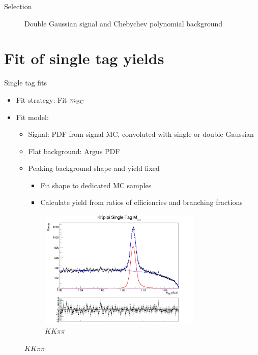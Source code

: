 \documentclass{beamer}
\begin{document}
\begin{frame}{Selection}
\begin{figure}
\begin{subfigure}{0.5\textwidth}
    \end{subfigure}
    \caption{Double Gaussian signal and Chebychev polynomial background}
  \end{figure}
\end{frame}

\section{Fit of single tag yields}
\begin{frame}{Single tag fits}
  \begin{itemize}
    \item{Fit strategy: Fit $m_{\rm BC}$}
    \item{Fit model:}
    \begin{itemize}
      \item{Signal: PDF from signal MC, convoluted with single or double Gaussian}
      \item{Flat background: Argus PDF}
      \item{Peaking background shape and yield fixed}
      \begin{itemize}
        \item{Fit shape to dedicated MC samples}
        \item{Calculate yield from ratios of efficiencies and branching fractions}
      \end{itemize}
    \end{itemize}
  \end{itemize}
  \begin{figure}
    \centering
    \begin{subfigure}{0.5\textwidth}
      \centering
      \includegraphics[width=0.85\textwidth]{Plots/KKpipi_SingleTag_MBC_Plot.png}
      \caption{$KK\pi\pi$}

\end{subfigure}
\end{figure}
\end{frame}
\end{document}
